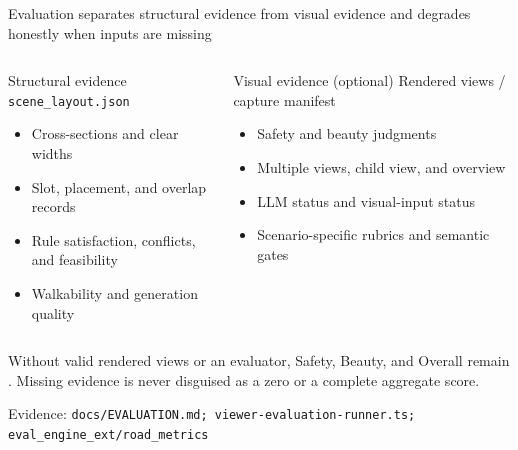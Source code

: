 \documentclass[aspectratio=169,10pt]{ctexbeamer}
\newcommand{\sourcefoot}[1]{\vfill{\tiny\color{hkustgrey}Evidence: \texttt{#1}}}
\newcommand{\artifact}[1]{\texttt{\color{hkustblue2}#1}}
\begin{document}
\begin{frame}{Evaluation separates structural evidence from visual evidence and degrades honestly when inputs are missing}
  \begin{columns}[T,onlytextwidth]
      \begin{block}{Structural evidence}
        \artifact{scene\_layout.json}
        \begin{itemize}
          \item Cross-sections and clear widths
          \item Slot, placement, and overlap records
          \item Rule satisfaction, conflicts, and feasibility
          \item Walkability and generation quality
        \end{itemize}
      \end{block}
      \begin{exampleblock}{Visual evidence (optional)}
        Rendered views / capture manifest
        \begin{itemize}
          \item Safety and beauty judgments
          \item Multiple views, child view, and overview
          \item LLM status and visual-input status
          \item Scenario-specific rubrics and semantic gates
        \end{itemize}
      \end{exampleblock}
  \end{columns}
  \deckgap
  \begin{callout}
    Without valid rendered views or an evaluator, Safety, Beauty, and Overall remain . Missing evidence is never disguised as a zero or a complete aggregate score.
  \end{callout}
  \sourcefoot{docs/EVALUATION.md; viewer-evaluation-runner.ts; eval\_engine\_ext/road\_metrics}
\end{frame}
\end{document}
